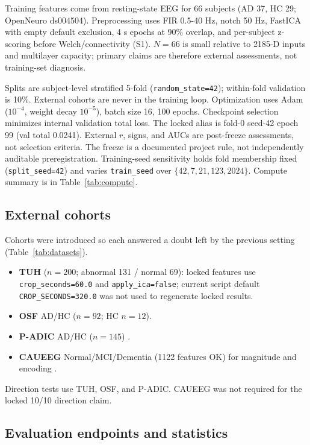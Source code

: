 Training features come from resting-state EEG for 66 subjects (AD 37, HC 29; OpenNeuro ds004504). Preprocessing uses FIR 0.5-40 Hz, notch 50 Hz, FastICA with empty default exclusion, 4 s epochs at 90\% overlap, and per-subject z-scoring before Welch/connectivity (S1). \(N=66\) is small relative to 2185-D inputs and multilayer capacity; primary claims are therefore external assessments, not training-set diagnosis.

Splits are subject-level stratified 5-fold (\texttt{random\_state=42}); within-fold validation is 10\%. External cohorts are never in the training loop. Optimization uses Adam (\(10^{-4}\), weight decay \(10^{-5}\)), batch size 16, 100 epochs. Checkpoint selection minimizes internal validation total loss. The locked alias is fold-0 seed-42 epoch 99 (val total 0.0241). External \(r\), signs, and AUCs are post-freeze assessments, not selection criteria. The freeze is a documented project rule, not independently auditable preregistration. Training-seed sensitivity holds fold membership fixed (\texttt{split\_seed=42}) and varies \texttt{train\_seed} over \(\{42,7,21,123,2024\}\). Compute summary is in Table~\ref{tab:compute}.

\subsection{External cohorts}

Cohorts were introduced so each answered a doubt left by the previous setting (Table~\ref{tab:datasets}).

\begin{itemize}
  \item \textbf{TUH} (\(n=200\); abnormal 131 / normal 69): locked features use \texttt{crop\_seconds=60.0} and \texttt{apply\_ica=false}; current script default \texttt{CROP\_SECONDS=320.0} was not used to regenerate locked results.
  \item \textbf{OSF} AD/HC (\(n=92\); HC \(n=12\)).
  \item \textbf{P-ADIC} AD/HC (\(n=145\)) \citep{Shor2021PADIC}.
  \item \textbf{CAUEEG} Normal/MCI/Dementia (1122 features OK) for magnitude and encoding \citep{Kim2023CAUEEG}.
\end{itemize}
Direction tests use TUH, OSF, and P-ADIC. CAUEEG was not required for the locked 10/10 direction claim.

\subsection{Evaluation endpoints and statistics}

